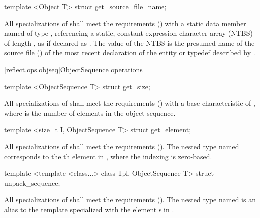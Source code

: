 \begin{std.txt}
\begin{itemdecl}
template <Object T> struct get_source_file_name;
\end{itemdecl}

\begin{itemdescr}
\pnum
All specializations of  shall meet the  requirements () with a static data member named  of type , referencing a static, constant expression character array (NTBS) of length , as if declared as . The value of the NTBS is the presumed name of the source file () of the most recent declaration of the entity or typedef described by .

\end{itemdescr}

\end{std.txt}

[reflect.ops.objseq]{ObjectSequence operations}

\begin{std.txt}\color{addclr}

\begin{itemdecl}
template <ObjectSequence T> struct get_size;
\end{itemdecl}

\begin{itemdescr}
\pnum
All specializations of  shall meet the  requirements () with a base characteristic of , where  is the number of elements in the object sequence.
\end{itemdescr}

\begin{itemdecl}
template <size_t I, ObjectSequence T> struct get_element;
\end{itemdecl}

\begin{itemdescr}
\pnum
All specializations of  shall meet the  requirements (). The nested type named  corresponds to the th element  in , where the indexing is zero-based.
\end{itemdescr}

\begin{itemdecl}
template <template <class...> class Tpl, ObjectSequence T> struct unpack_sequence;
\end{itemdecl}

\begin{itemdescr}
\pnum
All specializations of  shall meet the  requirements (). The nested type named  is an alias to the template  specialized with the element s in .
\end{itemdescr}
\end{std.txt}

